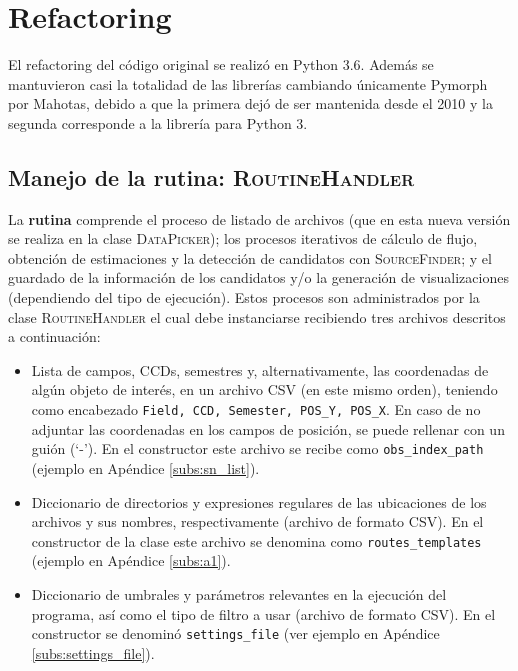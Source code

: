 \chapter{Refactoring}
\label{ch:refactoring}
El refactoring del c\'odigo original se realiz\'o en Python 3.6. Adem\'as se mantuvieron casi la totalidad de las librer\'ias cambiando \'unicamente Pymorph por Mahotas, debido a que la primera dej\'o de ser mantenida desde el 2010 y la segunda corresponde a la librer\'ia para Python 3.   

\section{Manejo de la rutina: \textsc{RoutineHandler}}

La \textbf{rutina} comprende el proceso de listado de archivos (que en esta nueva versi\'on se realiza en la clase \textsc{DataPicker}); los procesos iterativos de c\'alculo de flujo, obtenci\'on de estimaciones y la detecci\'on de candidatos con \textsc{SourceFinder}; y el guardado de la informaci\'on de los  candidatos y/o la generaci\'on de visualizaciones (dependiendo del tipo de ejecuci\'on). Estos procesos son administrados por la clase \textsc{RoutineHandler} el cual debe instanciarse recibiendo tres archivos descritos a continuaci\'on:


\begin{itemize}
\item Lista de campos, CCDs, semestres y, alternativamente, las coordenadas de alg\'un objeto de inter\'es, en un archivo CSV (en este mismo orden), teniendo como encabezado \texttt{Field, CCD, Semester, POS\_Y, POS\_X}. En caso de no adjuntar las coordenadas en los campos de posici\'on, se puede rellenar con un gui\'on (`-'). En el constructor este archivo se recibe como \texttt{obs\_index\_path} (ejemplo en Ap\'endice \ref{subs:sn_list}).
\item Diccionario de directorios y expresiones regulares de las ubicaciones de los archivos y sus nombres, respectivamente (archivo de formato CSV). En el constructor de la clase este archivo se denomina como \texttt{routes\_templates} (ejemplo en Ap\'endice \ref{subs:a1}).
\item Diccionario de umbrales y par\'ametros relevantes en la ejecuci\'on del programa, as\'i como el tipo de filtro a usar (archivo de formato CSV). En el constructor se denomin\'o \texttt{settings\_file} (ver ejemplo en Ap\'endice \ref{subs:settings_file}).
\end{itemize}
\bigskip

